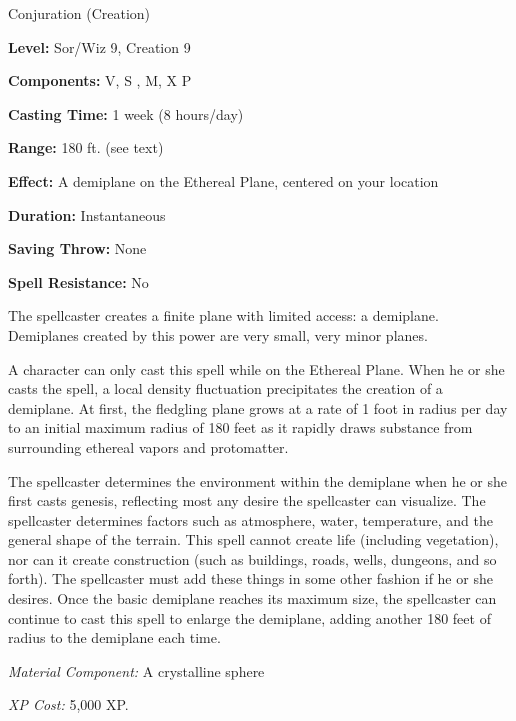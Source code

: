 
Conjuration (Creation)

\textbf{Level:} Sor/Wiz 9, Creation 9

\textbf{Components:} V, S , M, X P

\textbf{Casting Time:} 1 week (8 hours/day)

\textbf{Range:} 180 ft. (see text)

\textbf{Effect:} A demiplane on the Ethereal Plane, centered on your location

\textbf{Duration:} Instantaneous

\textbf{Saving Throw:} None

\textbf{Spell Resistance:} No

The spellcaster creates a finite plane with limited access: a demiplane. Demiplanes created by this power are very small, very minor planes.

A character can only cast this spell while on the Ethereal Plane. When he or she casts the spell, a local density fluctuation precipitates the creation of a demiplane. At first, the fledgling plane grows at a rate of 1 foot in radius per day to an initial maximum radius of 180 feet as it rapidly draws substance from surrounding ethereal vapors and protomatter.

The spellcaster determines the environment within the demiplane when he or she first casts genesis, reflecting most any desire the spellcaster can visualize. The spellcaster determines factors such as atmosphere, water, temperature, and the general shape of the terrain. This spell cannot create life (including vegetation), nor can it create construction (such as buildings, roads, wells, dungeons, and so forth). The spellcaster must add these things in some other fashion if he or she desires. Once the basic demiplane reaches its maximum size, the spellcaster can continue to cast this spell to enlarge the demiplane, adding another 180 feet of radius to the demiplane each time.

\textit{Material Component:} A crystalline sphere

\textit{XP Cost:} 5,000 XP.
